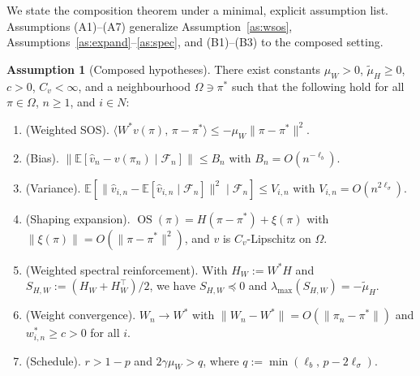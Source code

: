 \documentclass{article}
\theoremstyle{plain}
\theoremstyle{definition}
\newtheorem{assumption}{Assumption}
\theoremstyle{remark}
\newcommand{\E}{\mathbb{E}}
\DeclareMathOperator{\OS}{OS}
\begin{document}
We state the composition theorem under a minimal, explicit assumption list. Assumptions \textup{(A1)--(A7)} generalize Assumption~\ref{as:wsos}, Assumptions~\ref{as:expand}--\ref{as:spec}, and (B1)--(B3) to the composed setting.

\begin{assumption}[Composed hypotheses]\label{as:composition}
There exist constants $\mu_W>0$, $\tilde\mu_H\ge 0$, $c>0$, $C_v<\infty$, and a neighbourhood $\Omega\ni\pi^\ast$ such that the following hold for all $\pi\in\Omega$, $n\ge 1$, and $i\in N$:
\begin{enumerate}[label=\textup{(A\arabic*)},leftmargin=2.0em,itemsep=0.15em]
  \item \textup{(Weighted SOS).} $\langle W^\ast v(\pi),\,\pi-\pi^\ast\rangle \le -\mu_W\|\pi-\pi^\ast\|^2$.
  \item \textup{(Bias).} $\|\E[\hat v_n-v(\pi_n)\mid\mathcal{F}_n]\|\le B_n$ with $B_n=O(n^{-\ell_b})$.
  \item \textup{(Variance).} $\E[\|\hat v_{i,n}-\E[\hat v_{i,n}\mid\mathcal{F}_n]\|^2\mid\mathcal{F}_n]\le V_{i,n}$ with $V_{i,n}=O(n^{2\ell_\sigma})$.
  \item \textup{(Shaping expansion).} $\OS(\pi) = H(\pi-\pi^\ast)+\xi(\pi)$ with $\|\xi(\pi)\|=O(\|\pi-\pi^\ast\|^2)$, and $v$ is $C_v$-Lipschitz on $\Omega$.
  \item \textup{(Weighted spectral reinforcement).} With $H_W := W^\ast H$ and $S_{H,W} := (H_W+H_W^\top)/2$, we have $S_{H,W}\preceq 0$ and $\lambda_{\max}(S_{H,W})=-\tilde\mu_H$.
  \item \textup{(Weight convergence).} $W_n\to W^\ast$ with $\|W_n-W^\ast\|=O(\|\pi_n-\pi^\ast\|)$ and $w_{i,n}^\ast\ge c>0$ for all $i$.
  \item \textup{(Schedule).} $r>1-p$ and $2\gamma\mu_W > q$, where $q := \min(\ell_b,\,p-2\ell_\sigma)$.
\end{enumerate}
\end{assumption}
\end{document}

